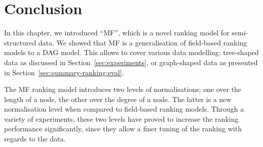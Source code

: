 \section{Conclusion}

In this chapter, we introduced ``MF'', which is a novel ranking model for semi-structured data. We showed that MF is a generalisation of field-based ranking models to a DAG model. This allows to cover various data modelling: tree-shaped data as discussed in Section~\ref{sec:experiments}, or graph-shaped data as presented in Section~\ref{sec:summary-ranking:eval}.

The MF ranking model introduces two levels of normalisations; one over the length of a node, the other over the degree of a node. The latter is a new normalisation level when compared to field-based ranking models. Through a variety of experiments, these two levels have proved to increase the ranking performance significantly, since they allow a finer tuning of the ranking with regards to the data.
